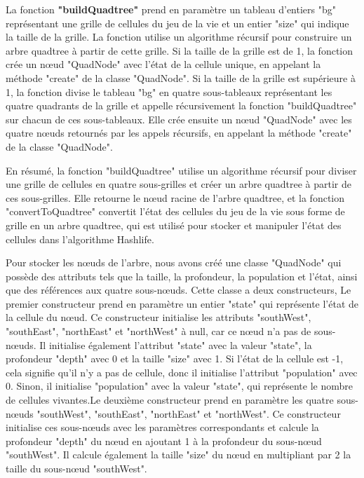 La fonction \textbf{"buildQuadtree"} prend en paramètre un tableau d'entiers "bg" représentant une grille de cellules du jeu de la vie et un entier "size" qui indique la taille de la grille. La fonction utilise un algorithme récursif pour construire un arbre quadtree à partir de cette grille. Si la taille de la grille est de 1, la fonction crée un nœud "QuadNode" avec l'état de la cellule unique, en appelant la méthode "create" de la classe "QuadNode". Si la taille de la grille est supérieure à 1, la fonction divise le tableau "bg" en quatre sous-tableaux représentant les quatre quadrants de la grille et appelle récursivement la fonction "buildQuadtree" sur chacun de ces sous-tableaux. Elle crée ensuite un nœud "QuadNode" avec les quatre nœuds retournés par les appels récursifs, en appelant la méthode "create" de la classe "QuadNode". \newline

En résumé, la fonction "buildQuadtree" utilise un algorithme récursif pour diviser une grille de cellules en quatre sous-grilles et créer un arbre quadtree à partir de ces sous-grilles. Elle retourne le nœud racine de l'arbre quadtree, et la fonction "convertToQuadtree" convertit l'état des cellules du jeu de la vie sous forme de grille en un arbre quadtree, qui est utilisé pour stocker et manipuler l'état des cellules dans l'algorithme Hashlife.\newline

Pour stocker les nœuds de l'arbre, nous avons créé une classe "QuadNode" qui possède des attributs tels que la taille, la profondeur, la population et l'état, ainsi que des références aux quatre sous-nœuds. Cette classe a deux constructeurs, Le premier constructeur prend en paramètre un entier "state" qui représente l'état de la cellule du nœud. Ce constructeur initialise les attributs "southWest", "southEast", "northEast" et "northWest" à null, car ce nœud n'a pas de sous-nœuds. Il initialise également l'attribut "state" avec la valeur "state", la profondeur "depth" avec 0 et la taille "size" avec 1. Si l'état de la cellule est -1, cela signifie qu'il n'y a pas de cellule, donc il initialise l'attribut "population" avec 0. Sinon, il initialise "population" avec la valeur "state", qui représente le nombre de cellules vivantes.Le deuxième constructeur prend en paramètre les quatre sous-nœuds "southWest", "southEast", "northEast" et "northWest". Ce constructeur initialise ces sous-nœuds avec les paramètres correspondants et calcule la profondeur "depth" du nœud en ajoutant 1 à la profondeur du sous-nœud "southWest". Il calcule également la taille "size" du nœud en multipliant par 2 la taille du sous-nœud "southWest".\newline 

